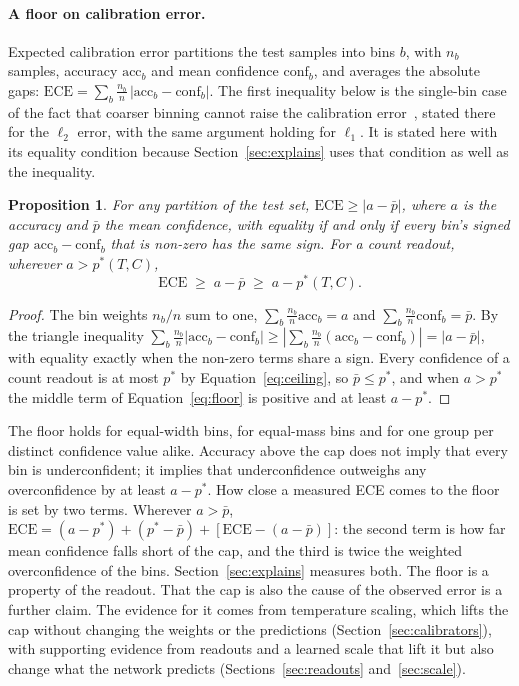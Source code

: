 \documentclass[10pt]{article}
\newtheorem{proposition}{Proposition}
\begin{document}
\paragraph{A floor on calibration error.}
Expected calibration error partitions the test samples into bins $b$, with $n_b$ samples, accuracy
$\mathrm{acc}_b$ and mean confidence $\mathrm{conf}_b$, and averages the absolute gaps:
$\mathrm{ECE}=\sum_b \frac{n_b}{n}\,|\mathrm{acc}_b-\mathrm{conf}_b|$.
The first inequality below is the single-bin case of the fact that coarser binning cannot raise
the calibration error~\citep[Proposition~3.3]{kumar2019verified}, stated there for the $\ell_2$ %
error, with the same argument holding for $\ell_1$. It is stated here with its equality condition
because Section~\ref{sec:explains} uses that condition as well as the inequality.
\begin{proposition}
\label{prop:floor}
For any partition of the test set, $\mathrm{ECE}\ge|a-\bar p|$, where $a$ is the accuracy and
$\bar p$ the mean confidence, with equality if and only if every bin's signed gap
$\mathrm{acc}_b-\mathrm{conf}_b$ that is non-zero has the same sign. For a count readout, wherever
$a>p^{*}(T,C)$,
\begin{equation}
\label{eq:floor}
\mathrm{ECE}\;\ge\; a-\bar p \;\ge\; a-p^{*}(T,C).
\end{equation}
\end{proposition}
\begin{proof}
The bin weights $n_b/n$ sum to one, $\sum_b \frac{n_b}{n}\mathrm{acc}_b=a$ and
$\sum_b \frac{n_b}{n}\mathrm{conf}_b=\bar p$. By the triangle inequality
$\sum_b \frac{n_b}{n}|\mathrm{acc}_b-\mathrm{conf}_b|\ge|\sum_b \frac{n_b}{n}(\mathrm{acc}_b-\mathrm{conf}_b)|=|a-\bar p|$,
with equality exactly when the non-zero terms share a sign. Every confidence of a count readout
is at most $p^{*}$ by Equation~\eqref{eq:ceiling}, so $\bar p\le p^{*}$, and when $a>p^{*}$ the
middle term of Equation~\eqref{eq:floor} is positive and at least $a-p^{*}$.
\end{proof}
The floor holds for equal-width bins, for equal-mass bins and for one group per distinct
confidence value alike. Accuracy above the cap does not imply that every bin is underconfident;
it implies that underconfidence outweighs any overconfidence by at least $a-p^{*}$. How close a
measured ECE comes to the floor is set by two terms. Wherever $a>\bar p$,
$\mathrm{ECE}=(a-p^{*})+(p^{*}-\bar p)+[\mathrm{ECE}-(a-\bar p)]$: the second term is how far mean
confidence falls short of the cap, and the third is twice the weighted overconfidence of the
bins. Section~\ref{sec:explains} measures both. The floor is a property of the readout. That the cap is
also the cause of the observed error is a further claim. The evidence for it comes from
temperature scaling, which lifts the cap without changing the weights or the predictions
(Section~\ref{sec:calibrators}), with supporting evidence from readouts and a learned scale that
lift it but also change what the network predicts (Sections~\ref{sec:readouts} and~\ref{sec:scale}).
\end{document}
